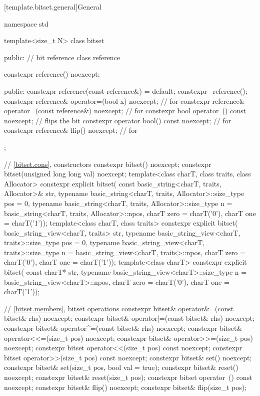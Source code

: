[template.bitset.general]{General}%
%
\begin{codeblock}
namespace std {
  template<size_t N> class bitset {
  public:
    // bit reference
    class reference {
      constexpr reference() noexcept;

    public:
      constexpr reference(const reference&) = default;
      constexpr ~reference();
      constexpr reference& operator=(bool x) noexcept;              // for 
      constexpr reference& operator=(const reference&) noexcept;    // for 
      constexpr bool operator~() const noexcept;                    // flips the bit
      constexpr operator bool() const noexcept;                     // for 
      constexpr reference& flip() noexcept;                         // for 
    };

    // \ref{bitset.cons}, constructors
    constexpr bitset() noexcept;
    constexpr bitset(unsigned long long val) noexcept;
    template<class charT, class traits, class Allocator>
      constexpr explicit bitset(
        const basic_string<charT, traits, Allocator>& str,
        typename basic_string<charT, traits, Allocator>::size_type pos = 0,
        typename basic_string<charT, traits, Allocator>::size_type n
          = basic_string<charT, traits, Allocator>::npos,
        charT zero = charT('0'),
        charT one = charT('1'));
    template<class charT, class traits>
      constexpr explicit bitset(
        basic_string_view<charT, traits> str,
        typename basic_string_view<charT, traits>::size_type pos = 0,
        typename basic_string_view<charT, traits>::size_type n
          = basic_string_view<charT, traits>::npos,
        charT zero = charT('0'),
        charT one = charT('1'));
    template<class charT>
      constexpr explicit bitset(
        const charT* str,
        typename basic_string_view<charT>::size_type n = basic_string_view<charT>::npos,
        charT zero = charT('0'),
        charT one = charT('1'));

    // \ref{bitset.members}, bitset operations
    constexpr bitset& operator&=(const bitset& rhs) noexcept;
    constexpr bitset& operator|=(const bitset& rhs) noexcept;
    constexpr bitset& operator^=(const bitset& rhs) noexcept;
    constexpr bitset& operator<<=(size_t pos) noexcept;
    constexpr bitset& operator>>=(size_t pos) noexcept;
    constexpr bitset  operator<<(size_t pos) const noexcept;
    constexpr bitset  operator>>(size_t pos) const noexcept;
    constexpr bitset& set() noexcept;
    constexpr bitset& set(size_t pos, bool val = true);
    constexpr bitset& reset() noexcept;
    constexpr bitset& reset(size_t pos);
    constexpr bitset  operator~() const noexcept;
    constexpr bitset& flip() noexcept;
    constexpr bitset& flip(size_t pos);

}}
\end{codeblock}

